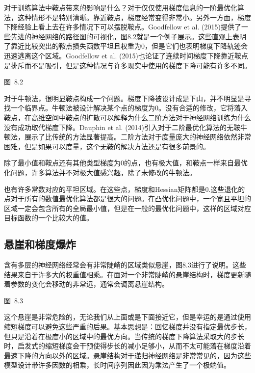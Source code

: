 对于训练算法中鞍点带来的影响是什么？对于仅仅使用梯度信息的一阶最优化算法，这种情形不是特别清晰。靠近鞍点，梯度经常变得非常小。另外一方面，梯度下降经验上看上去在许多情况下可以摆脱鞍点。Goodfellow et al. (2015)提供了一些先进的神经网络的路径图的可视化，图8.2就是一个例子展示。这些直观上表明了靠近比较突出的鞍点损失函数平坦且权重为0，但是它们也表明梯度下降轨迹会迅速逃离这个区域。Goodfellow et al. (2015)也论证了连续时间梯度下降靠近鞍点是排斥而不是吸引，但是这种情况与许多现实中使用的梯度下降可能有许多不同。

\begin{center}
图~8.2
\end{center}

对于牛顿法，很明显鞍点构成一个问题。梯度下降被设计成是下山，并不明显是寻找一个临界点。牛顿法被设计解决某个点的梯度为0。没有合适的修改，它将落入鞍点，在高维空间中鞍点的扩散可以解释为什么二阶方法对于神经网络训练为什么没有成功取代梯度下降。Dauphin et al. (2014)引入对于二阶最优化算法的无鞍牛顿法，展示了比传统的方法显著提高。二阶方法对于度量庞大的神经网络依然非常困难，但是如果可以度量，这个无鞍的解决方法还是有很多前景的。

除了最小值和鞍点还有其他类型梯度为0的点，也有极大值，和鞍点一样来自最优化问题，许多算法并不对极大值感兴趣，除了未修改的牛顿法。

也有许多常数对应的平坦区域。在这些点，梯度和Hessian矩阵都是0.这些退化的点对于所有的数值最优化算法都是很大的问题。在凸优化问题中，一个宽且平坦的区域一定会包含所有的全局最小值，但是在一般的最优化问题中，这样的区域对应目标函数的一个比较大的值。

\subsection{悬崖和梯度爆炸}
含有多层的神经网络经常会有非常陡峭的区域类似悬崖，图8.3进行了说明。这些结果来自于许多大的权重值相乘。在面对一个非常陡峭的悬崖结构时，梯度更新随着参数的变化会移动的非常远，通常会调离悬崖结构。

\begin{center}
图~8.3
\end{center}

这个悬崖是非常危险的，无论我们从上面或是下面接近它，但是幸运的是通过使用缩短梯度可以避免这些严重的后果。基本思想是：回忆梯度并没有指定最优步长，但只是沿着在极度小的区域中的最优方向。当传统的梯度下降算法采取大的步长时，启发式的缩短梯度会干预使得步长的减小足够小，从而不太可能落在梯度沿着最速下降的方向以外的区域。悬崖结构对于递归神经网络是非常常见的，因为这些模型设计带许多因数的相乘，长时间序列因此因为乘法产生了一个极端值。

